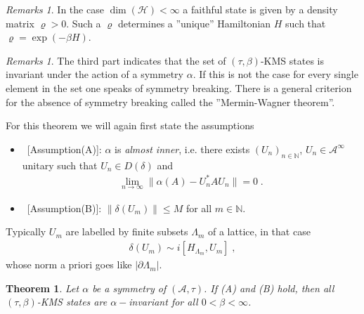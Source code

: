 \documentclass[
a4paper, %
11pt, %
onecolumn, %
openany, %
]{memoir}
\theoremstyle{definition}
\theoremstyle{remark}
\newtheorem{remarks}[definition]{Remarks}
\theoremstyle{plain}
\newtheorem{theorem}[definition]{Theorem}
\begin{document}
\begin{remarks}
In the case $\dim(\mathcal{H})<\infty$ a faithful state is given by a density matrix $\varrho>0$. Such a $\varrho$ determines a ''unique'' Hamiltonian $H$ such that $\varrho=\exp(-\beta H)$.
\end{remarks}
\begin{remarks}
The third part indicates that the set of $(\tau,\beta)$-KMS states is invariant under the action of a symmetry $\alpha$. If this is not the case for every single element in the set one speaks of symmetry breaking. There is a general criterion for the absence of symmetry breaking called the ''Mermin-Wagner theorem''.
\end{remarks}
For this theorem we will again first state the assumptions \begin{itemize}
\item~[Assumption(A)]: $\alpha$ is \textit{almost inner}, i.e. there exists $(U_n)_{n\in\mathbb{N}}$, $U_n\in \mathcal{A}^{\infty}$ unitary such that $U_n\in D(\delta)$ and \begin{align}
\lim\limits_{n\rightarrow\infty}\|\alpha(A)-U_n^*AU_n\| =0 \; .
\end{align}
\item~[Assumption(B)]: $\|\delta(U_m)\|\leq M$ for all $m\in\mathbb{N}$.
\end{itemize}
Typically $U_m$ are labelled by finite subsets $\Lambda_m$ of a lattice, in that case \begin{align}
\delta(U_m)\sim i[H_{\Lambda_m},U_m]\; ,
\end{align}
whose norm a priori goes like $|\partial\Lambda_m|$.
\begin{theorem}\label{thm::thm_with_assumptionsAB}
Let $\alpha$ be a symmetry of $(\mathcal{A},\tau)$. If (A) and (B) hold, then all $(\tau,\beta)$-KMS states are $\alpha-$invariant for all $0<\beta<\infty$.
\end{theorem}
\end{document}
